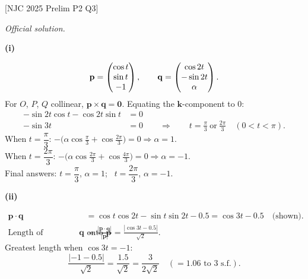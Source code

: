 \documentclass[a4paper,11pt,oneside]{book}
\newcounter{wq}
\newcommand{\Q}[1]{\par\needspace{5\baselineskip}\medskip\stepcounter{wq}\noindent\textbf{\thewq}\quad #1\par}
\begin{document}
\Q{\textcolor{black!60}{\small[NJC 2025 Prelim P2 Q3]}\par\smallskip\textit{Official solution.}}
\par\smallskip\noindent\textbf{(i)}\par
\[\mathbf p=\begin{pmatrix}\cos t\\\sin t\\-1\end{pmatrix},\qquad\mathbf q=\begin{pmatrix}\cos 2t\\-\sin 2t\\\alpha\end{pmatrix}.\]
For $O$, $P$, $Q$ collinear, $\mathbf p\times\mathbf q=\mathbf 0$. Equating the $\mathbf k$-component to $0$:
\begin{align*}
-\sin 2t\cos t-\cos 2t\sin t&=0\\
-\sin 3t&=0\qquad\Rightarrow\qquad t=\frac{\pi}{3}\ \text{or}\ \frac{2\pi}{3}\quad(0<t<\pi).
\end{align*}
When $t=\dfrac{\pi}{3}$: $-\big(\alpha\cos\frac{\pi}{3}+\cos\frac{2\pi}{3}\big)=0\Rightarrow\alpha=1$.\\
When $t=\dfrac{2\pi}{3}$: $-\big(\alpha\cos\frac{2\pi}{3}+\cos\frac{4\pi}{3}\big)=0\Rightarrow\alpha=-1$.\\
Final answers: $t=\dfrac{\pi}{3}$, $\alpha=1$; \ $t=\dfrac{2\pi}{3}$, $\alpha=-1$.
\par\smallskip\noindent\textbf{(ii)}\par
\begin{align*}
\mathbf p\cdot\mathbf q&=\cos t\cos 2t-\sin t\sin 2t-0.5=\cos 3t-0.5\quad\text{(shown)}.\\
\text{Length of projection of }\mathbf q\text{ onto }\mathbf p
&=\frac{|\mathbf p\cdot\mathbf q|}{|\mathbf p|}
=\frac{|\cos 3t-0.5|}{\sqrt{2}}.
\end{align*}
Greatest length when $\cos 3t=-1$:
\[\frac{|-1-0.5|}{\sqrt{2}}=\frac{1.5}{\sqrt{2}}=\frac{3}{2\sqrt{2}}\quad(=1.06\text{ to 3 s.f.}).\]
\end{document}
